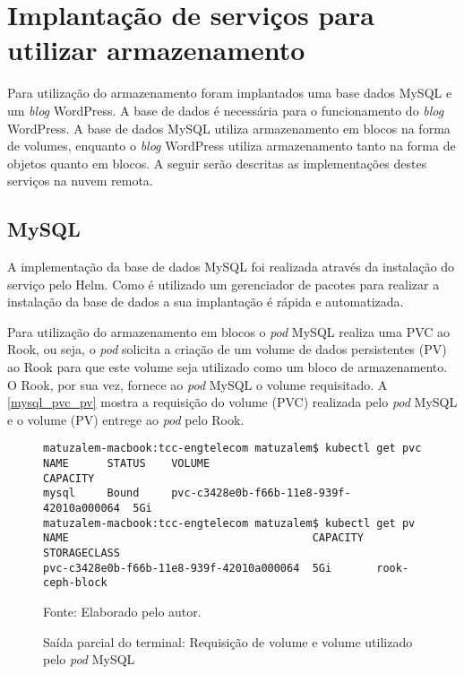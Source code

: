 \section{Implantação de serviços para utilizar armazenamento}

Para utilização do armazenamento foram implantados uma base dados MySQL e um \textit{blog} WordPress. A base de dados é necessária para o funcionamento do \textit{blog} WordPress. A base de dados MySQL utiliza armazenamento em blocos na forma de volumes, enquanto o \textit{blog} WordPress utiliza armazenamento tanto na forma de objetos quanto em blocos. A seguir serão descritas as implementações destes serviços na nuvem remota.

\subsection{MySQL}

A implementação da base de dados MySQL foi realizada através da instalação do serviço pelo Helm. Como é utilizado um gerenciador de pacotes para realizar a instalação da base de dados a sua implantação é rápida e automatizada.

Para utilização do armazenamento em blocos o \textit{pod} MySQL realiza uma \ac{PVC} ao Rook, ou seja, o \textit{pod} solicita a criação de um volume de dados persistentes (\ac{PV}) ao Rook para que este volume seja utilizado como um bloco de armazenamento. O Rook, por sua vez, fornece ao \textit{pod} MySQL o volume requisitado. A \autoref{mysql_pvc_pv} mostra a requisição do volume (\ac{PVC}) realizada pelo \textit{pod} MySQL e o volume (\ac{PV}) entrege ao \textit{pod} pelo Rook.

\begin{figure}[!htpb]
	\centering
	\caption{Saída parcial do terminal: Requisição de volume e volume utilizado pelo \textit{pod} MySQL}
    \begin{verbatim}
matuzalem-macbook:tcc-engtelecom matuzalem$ kubectl get pvc
NAME      STATUS    VOLUME                                    CAPACITY
mysql     Bound     pvc-c3428e0b-f66b-11e8-939f-42010a000064  5Gi      
matuzalem-macbook:tcc-engtelecom matuzalem$ kubectl get pv
NAME                                      CAPACITY  STORAGECLASS
pvc-c3428e0b-f66b-11e8-939f-42010a000064  5Gi       rook-ceph-block
    \end{verbatim}
	Fonte: Elaborado pelo autor.
 	\label{mysql_pvc_pv}
\end{figure}

